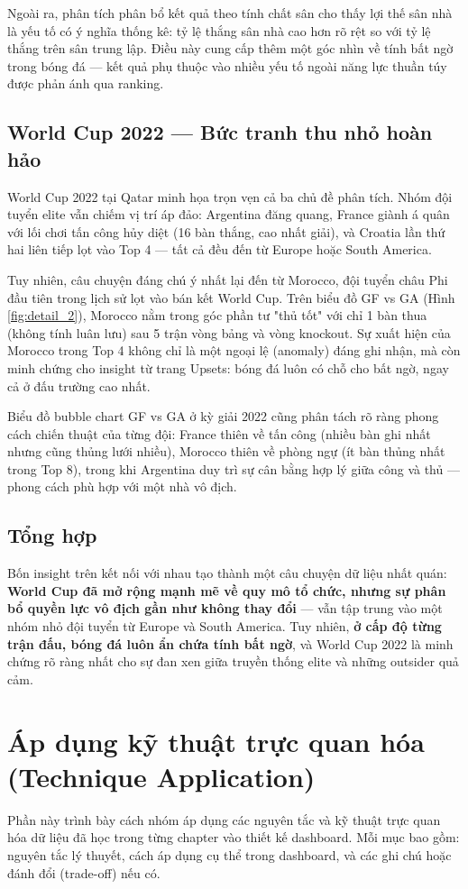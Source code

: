 \documentclass[12pt,a4paper]{article}
\begin{document}
Ngoài ra, phân tích phân bổ kết quả theo tính chất sân cho thấy lợi thế sân nhà là yếu tố có ý nghĩa thống kê: tỷ lệ thắng sân nhà cao hơn rõ rệt so với tỷ lệ thắng trên sân trung lập. Điều này cung cấp thêm một góc nhìn về tính bất ngờ trong bóng đá --- kết quả phụ thuộc vào nhiều yếu tố ngoài năng lực thuần túy được phản ánh qua ranking.

\subsection{World Cup 2022 --- Bức tranh thu nhỏ hoàn hảo}
World Cup 2022 tại Qatar minh họa trọn vẹn cả ba chủ đề phân tích. Nhóm đội tuyển elite vẫn chiếm vị trí áp đảo: Argentina đăng quang, France giành á quân với lối chơi tấn công hủy diệt (16 bàn thắng, cao nhất giải), và Croatia lần thứ hai liên tiếp lọt vào Top 4 --- tất cả đều đến từ Europe hoặc South America.

Tuy nhiên, câu chuyện đáng chú ý nhất lại đến từ Morocco, đội tuyển châu Phi đầu tiên trong lịch sử lọt vào bán kết World Cup. Trên biểu đồ GF vs GA (Hình \ref{fig:detail_2}), Morocco nằm trong góc phần tư "thủ tốt" với chỉ 1 bàn thua (không tính luân lưu) sau 5 trận vòng bảng và vòng knockout. Sự xuất hiện của Morocco trong Top 4 không chỉ là một ngoại lệ (anomaly) đáng ghi nhận, mà còn minh chứng cho insight từ trang Upsets: bóng đá luôn có chỗ cho bất ngờ, ngay cả ở đấu trường cao nhất.

Biểu đồ bubble chart GF vs GA ở kỳ giải 2022 cũng phân tách rõ ràng phong cách chiến thuật của từng đội: France thiên về tấn công (nhiều bàn ghi nhất nhưng cũng thủng lưới nhiều), Morocco thiên về phòng ngự (ít bàn thủng nhất trong Top 8), trong khi Argentina duy trì sự cân bằng hợp lý giữa công và thủ --- phong cách phù hợp với một nhà vô địch.

\subsection{Tổng hợp}
Bốn insight trên kết nối với nhau tạo thành một câu chuyện dữ liệu nhất quán: \textbf{World Cup đã mở rộng mạnh mẽ về quy mô tổ chức, nhưng sự phân bổ quyền lực vô địch gần như không thay đổi} --- vẫn tập trung vào một nhóm nhỏ đội tuyển từ Europe và South America. Tuy nhiên, \textbf{ở cấp độ từng trận đấu, bóng đá luôn ẩn chứa tính bất ngờ}, và World Cup 2022 là minh chứng rõ ràng nhất cho sự đan xen giữa truyền thống elite và những outsider quả cảm.


\newpage
\section{Áp dụng kỹ thuật trực quan hóa (Technique Application)}
Phần này trình bày cách nhóm áp dụng các nguyên tắc và kỹ thuật trực quan hóa dữ liệu đã học trong từng chapter vào thiết kế dashboard. Mỗi mục bao gồm: nguyên tắc lý thuyết, cách áp dụng cụ thể trong dashboard, và các ghi chú hoặc đánh đổi (trade-off) nếu có.
\end{document}
